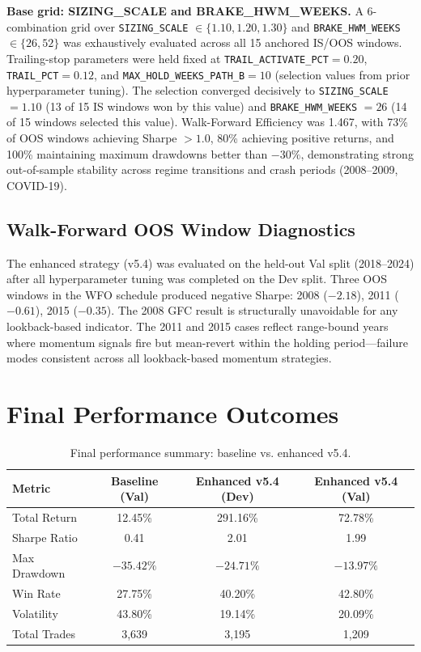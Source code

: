 \documentclass[11pt,twoside,a4paper]{article}
\begin{document}
\textbf{Base grid: SIZING\_SCALE and BRAKE\_HWM\_WEEKS.} A 6-combination grid over \texttt{SIZING\_SCALE} $\in \{1.10, 1.20, 1.30\}$ and \texttt{BRAKE\_HWM\_WEEKS} $\in \{26, 52\}$ was exhaustively evaluated across all 15 anchored IS/OOS windows. Trailing-stop parameters were held fixed at \texttt{TRAIL\_ACTIVATE\_PCT}$=0.20$, \texttt{TRAIL\_PCT}$=0.12$, and \texttt{MAX\_HOLD\_WEEKS\_PATH\_B}$=10$ (selection values from prior hyperparameter tuning). The selection converged decisively to \texttt{SIZING\_SCALE} $= 1.10$ (13 of 15 IS windows won by this value) and \texttt{BRAKE\_HWM\_WEEKS} $= 26$ (14 of 15 windows selected this value). Walk-Forward Efficiency was 1.467, with 73\% of OOS windows achieving Sharpe $> 1.0$, 80\% achieving positive returns, and 100\% maintaining maximum drawdowns better than $-30\%$, demonstrating strong out-of-sample stability across regime transitions and crash periods (2008--2009, COVID-19).

\subsection{Walk-Forward OOS Window Diagnostics}

The enhanced strategy (v5.4) was evaluated on the held-out Val split (2018--2024) after all hyperparameter tuning was completed on the Dev split. Three OOS windows in the WFO schedule produced negative Sharpe: 2008 ($-2.18$), 2011 ($-0.61$), 2015 ($-0.35$). The 2008 GFC result is structurally unavoidable for any lookback-based indicator. The 2011 and 2015 cases reflect range-bound years where momentum signals fire but mean-revert within the holding period---failure modes consistent across all lookback-based momentum strategies.




\section{Final Performance Outcomes}

\begin{table}[H]
\centering
\caption{Final performance summary: baseline vs. enhanced v5.4.}
\label{tab:final-performance-outcomes}
\begin{tabular}{lccc}
\hline
Metric & Baseline (Val) & Enhanced v5.4 (Dev) & Enhanced v5.4 (Val) \\
\hline
Total Return & 12.45\% & 291.16\% & 72.78\% \\
Sharpe Ratio & 0.41 & 2.01 & 1.99 \\
Max Drawdown & $-35.42\%$ & $-24.71\%$ & $-13.97\%$ \\
Win Rate & 27.75\% & 40.20\% & 42.80\% \\
Volatility & 43.80\% & 19.14\% & 20.09\% \\
Total Trades & 3,639 & 3,195 & 1,209 \\
\hline
\end{tabular}
\end{table}
\end{document}
